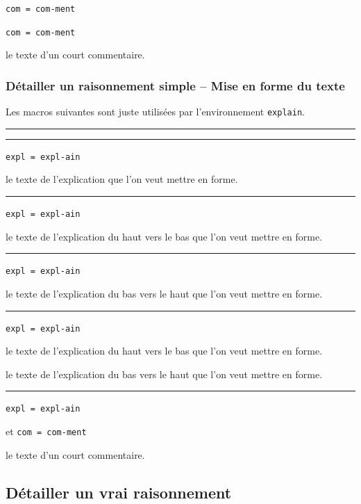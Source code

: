 \documentclass[12pt,a4paper]{book}
\newcommand\env[1]{\texttt{#1}}
\theoremstyle{definition}
\newcommand\separation{
	\medskip
	\hfill\rule{0.5\textwidth}{0.75pt}\hfill
	\medskip
}
\newcommand\mwhyprefix[2]{%
	\texttt{#1 = #1-#2}%
}
\begin{document}
{{ \hfill \mwhyprefix{com}{ment}

 \hfill \mwhyprefix{com}{ment}


\IDarg{} le texte d'un court commentaire.




\subsubsection{Détailler un raisonnement simple -- Mise en forme du texte}

Les macros suivantes sont juste utilisées par l'environnement \env{explain}.


\separation




\separation


 \hfill \mwhyprefix{expl}{ain}

\IDarg{} le texte de l'explication que l'on veut mettre en forme.


\separation


 \hfill \mwhyprefix{expl}{ain}

\IDarg{} le texte de l'explication du haut vers le bas que l'on veut mettre en forme.


\separation


 \hfill \mwhyprefix{expl}{ain}

\IDarg{} le texte de l'explication du bas vers le haut que l'on veut mettre en forme.


\separation


 \hfill \mwhyprefix{expl}{ain}

 le texte de l'explication du haut vers le bas que l'on veut mettre en forme.

 le texte de l'explication du bas vers le haut que l'on veut mettre en forme.


\separation


 \hfill \mwhyprefix{expl}{ain}
                            et \mwhyprefix{com}{ment}

\IDarg{} le texte d'un court commentaire.








\subsection{Détailler un \og vrai \fg{} raisonnement}



}}
\end{document}
